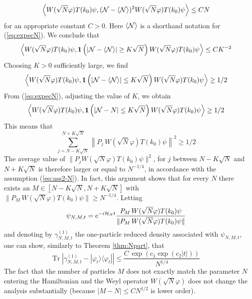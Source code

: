 \documentclass[11pt,a4paper]{article}
\newcommand{\tr}{\mbox{Tr}}
\newcommand{\cH}{{\cal H}}
\newcommand{\cN}{{\cal N}}
\begin{document}
\begin{itemize}
 \[ \left\langle W(\sqrt{N} \varphi) T(k_0) \psi, (\cN - \langle \cN \rangle)^2 W(\sqrt{N} \varphi) T(k_0) \psi \right\rangle \leq C N \]
for an appropriate constant $C >0$. Here $\langle \cN \rangle$ is a shorthand notation for (\ref{eq:expecN}). We conclude that
\[  \left\langle W(\sqrt{N} \varphi) T(k_0) \psi,  {\bf 1} \left(| \cN - \langle \cN \rangle | \geq K \sqrt{N} \right)  W(\sqrt{N} \varphi) T(k_0) \psi \right\rangle \leq C K^{-2} \]
Choosing $K >0$ sufficiently large, we find
\[ \left\langle W(\sqrt{N} \varphi) T(k_0) \psi,  {\bf 1} \left(| \cN - \langle \cN \rangle | \leq K \sqrt{N} \right)  W(\sqrt{N} \varphi) T(k_0) \psi \right\rangle \geq 1/2 \] 
{F}rom (\ref{eq:expecN}), adjusting the value of $K$, we obtain
\[ \left\langle W(\sqrt{N} \varphi) T(k_0) \psi,  {\bf 1} \left(| \cN - N | \leq K \sqrt{N} \right)  W(\sqrt{N} \varphi) T(k_0) \psi \right\rangle \geq 1/2 \] 
This means that
\[ \sum_{j= N - K \sqrt{N}}^{N+K \sqrt{N}} \left\| P_j \,  W(\sqrt{N} \varphi) T(k_0) \psi \right\|^2 \geq 1/2 \]
The average value of $\| P_j W (\sqrt{N} \varphi) T(k_0) \psi \|^2$, for $j$ between $N- K \sqrt{N}$ and $N+K \sqrt{N}$ is therefore larger or equal to $N^{-1/4}$, in accordance with the assumption (\ref{eq:ass2-N}). In fact, this argument shows that for every $N$ there exists an $M \in [N-K \sqrt{N} , N + K \sqrt{N}]$ with $\| P_M \, W(\sqrt{N} \varphi) T(k_0) \psi \| \geq N^{-1/4}$. Letting \[ \psi_{N,M,t} = e^{-i \cH_N t}  \frac{P_M \, W(\sqrt{N} \varphi) T(k_0) \psi}{\|  P_M \, W(\sqrt{N} \varphi) T(k_0) \psi \|} \]
and denoting by $\gamma^{(1)}_{N,M,t}$ the one-particle reduced density associated with $\psi_{N,M,t}$, one can show, similarly to Theorem \ref{thm:Npart}, that
\[ \tr \; \left| \gamma^{(1)}_{N,M,t} - |\varphi_t \rangle \langle \varphi_t| \right| \leq  \frac{C\,  \exp \left( c_1 \exp (c_2 |t|) \right)}{N^{1/4}} \]
The fact that the number of particles $M$ does not exactly match the parameter $N$ entering the Hamiltonian and the Weyl operator $W(\sqrt{N} \varphi)$ does not change the analysis substantially (because $|M - N| \leq C N^{1/2}$ is lower order). 
\end{itemize}
\end{document}
